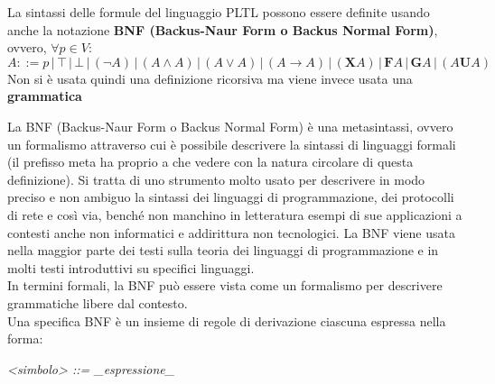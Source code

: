 \documentclass[a4paper,12pt, oneside]{book}
\begin{document}
\begin{definizione}
  La sintassi delle formule del linguaggio PLTL possono essere definite usando
  anche la notazione \textbf{BNF (Backus-Naur Form o Backus Normal Form)},
  ovvero, $\forall p\in V$:
  \[A::=p\,|\,\top\,|\,\bot\,|\,(\neg A)\,|\,(A\land A)\,|\,(A\lor A)\,|\,(A\to
    A)\,|\,(\mathbf{X}A)\,|\,\mathbf{F}A\,|\,\mathbf{G}A\,|\,(A\mathbf{U}A)\]
  Non si è usata quindi una definizione ricorsiva ma viene invece usata una
  \textbf{grammatica}\\
  \begin{shaded}
    La BNF (Backus-Naur Form o Backus Normal Form) è una metasintassi, ovvero un
    formalismo attraverso cui è possibile descrivere la sintassi di linguaggi
    formali (il prefisso meta ha proprio a che vedere con la natura circolare di
    questa definizione). Si tratta di uno strumento molto usato per descrivere
    in modo preciso e non ambiguo la sintassi dei linguaggi di programmazione,
    dei protocolli di rete e così via, benché non manchino in letteratura esempi
    di sue applicazioni a contesti anche non informatici e addirittura non
    tecnologici. La BNF viene usata nella maggior parte dei testi sulla teoria
    dei linguaggi di programmazione e in molti testi introduttivi su specifici
    linguaggi. \\
    In termini formali, la BNF può essere vista come un formalismo per descrivere
    grammatiche libere dal contesto.  \\
    Una specifica BNF è un insieme di regole di derivazione ciascuna espressa
    nella forma: 
    \begin{center}
      \textit{<simbolo> ::= \_espressione\_}
    \end{center}
  \end{shaded}
\end{definizione}
\newpage
\end{document}
